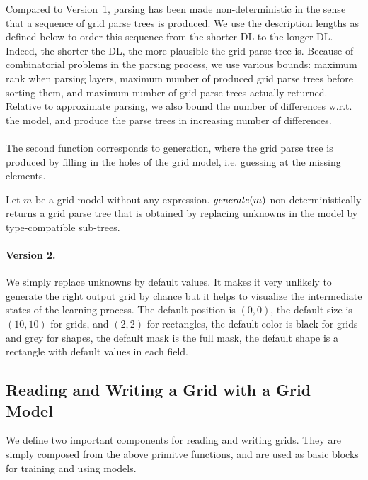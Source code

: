 \documentclass[a4paper]{llncs}
\begin{document}
Compared to Version~1, parsing has been made non-deterministic in the
sense that a sequence of grid parse trees is produced. We use the
description lengths as defined below to order this sequence from the
shorter DL to the longer DL. Indeed, the shorter the DL, the more
plausible the grid parse tree is. Because of combinatorial problems in
the parsing process, we use various bounds: maximum rank when parsing
layers, maximum number of produced grid parse trees before sorting
them, and maximum number of grid parse trees actually
returned. Relative to approximate parsing, we also bound the number of
differences w.r.t. the model, and produce the parse trees in
increasing number of differences.

\paragraph{}
The second function corresponds to generation, where the grid parse
tree is produced by filling in the holes of the grid model,
i.e. guessing at the missing elements.

\begin{definition}
  Let $m$ be a grid model without any expression. ${\it generate}(m)$
  non-deterministically returns a grid parse tree that is obtained by
  replacing unknowns in the model by type-compatible sub-trees.
\end{definition}

\paragraph{Version 2.} We simply replace unknowns by default
values. It makes it very unlikely to generate the right output grid by
chance but it helps to visualize the intermediate states of the
learning process. The default position is $(0,0)$, the default size is
$(10,10)$ for grids, and $(2,2)$ for rectangles, the default color is
black for grids and grey for shapes, the default mask is the full
mask, the default shape is a rectangle with default values in each
field.


\subsection{Reading and Writing a Grid with a Grid Model}
\label{read:write}

We define two important components for reading and writing grids.
They are simply composed from the above primitve functions, and are
used as basic blocks for training and using models.
\end{document}

